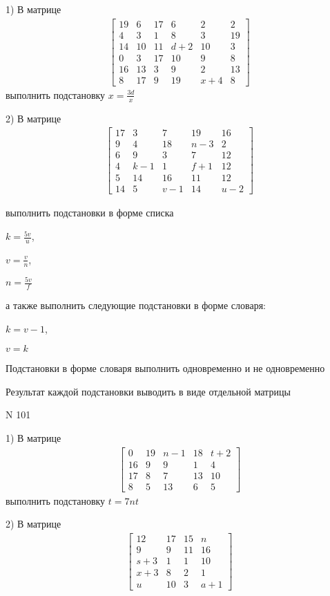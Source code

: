 \documentclass[11pt]{report}
\begin{document}
    1) В матрице
\begin{align*}
\left[\begin{matrix}19 & 6 & 17 & 6 & 2 & 2\\4 & 3 & 1 & 8 & 3 & 19\\14 & 10 & 11 & d + 2 & 10 & 3\\0 & 3 & 17 & 10 & 9 & 8\\16 & 13 & 3 & 9 & 2 & 13\\8 & 17 & 9 & 19 & x + 4 & 8\end{matrix}\right]
\end{align*}
выполнить подстановку $x=\frac{3 d}{x}$


    2) В матрице
\begin{align*}
\left[\begin{matrix}17 & 3 & 7 & 19 & 16\\9 & 4 & 18 & n - 3 & 2\\6 & 9 & 3 & 7 & 12\\4 & k - 1 & 1 & f + 1 & 12\\5 & 14 & 16 & 11 & 12\\14 & 5 & v - 1 & 14 & u - 2\end{matrix}\right]
\end{align*}

выполнить подстановки в форме списка

$k=\frac{5 v}{u}$,

$v=\frac{v}{n}$,

$n=\frac{5 v}{f}$

а также выполнить следующие подстановки в форме словаря:

$k=v - 1$,

$v=k$


    Подстановки в форме словаря выполнить одновременно и не одновременно


    Результат каждой подстановки выводить в виде отдельной матрицы

\newpage
N 101


    1) В матрице
\begin{align*}
\left[\begin{matrix}0 & 19 & n - 1 & 18 & t + 2\\16 & 9 & 9 & 1 & 4\\17 & 8 & 7 & 13 & 10\\8 & 5 & 13 & 6 & 5\end{matrix}\right]
\end{align*}
выполнить подстановку $t=7 n t$


    2) В матрице
\begin{align*}
\left[\begin{matrix}12 & 17 & 15 & n\\9 & 9 & 11 & 16\\s + 3 & 1 & 1 & 10\\x + 3 & 8 & 2 & 1\\u & 10 & 3 & a + 1\end{matrix}\right]
\end{align*}
\end{document}
